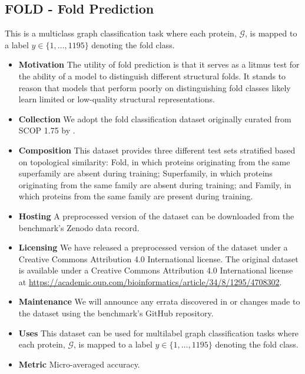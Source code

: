 \subsection{FOLD - Fold Prediction}
This is a multiclass graph classification task where each protein, $\mathcal{G}$, is mapped to a label $y \in \{1, \dots, 1195\}$ denoting the fold class.

\begin{itemize}
    \item \textbf{Motivation} The utility of fold prediction is that it serves as a litmus test for the ability of a model to distinguish different structural folds. It stands to reason that models that perform poorly on distinguishing fold classes likely learn limited or low-quality structural representations.
    \item \textbf{Collection} We adopt the fold classification dataset originally curated from SCOP 1.75 by \citep{hou2017}.
    \item \textbf{Composition} This dataset provides three different test sets stratified based on topological similarity: Fold, in which proteins originating from the same superfamily are absent during training; Superfamily, in which proteins originating from the same family are absent during training; and Family, in which proteins from the same family are present during training.
    \item \textbf{Hosting} A preprocessed version of the dataset can be downloaded from the benchmark's Zenodo data record.%
    \item \textbf{Licensing} We have released a preprocessed version of the dataset under a Creative Commons Attribution 4.0 International license. The original dataset is available under a Creative Commons Attribution 4.0 International license at \url{https://academic.oup.com/bioinformatics/article/34/8/1295/4708302}.
    \item \textbf{Maintenance} We will announce any errata discovered in or changes made to the dataset using the benchmark's GitHub repository.%
    \item \textbf{Uses} This dataset can be used for multilabel graph classification tasks where each protein, $\mathcal{G}$, is mapped to a label $y \in \{1, \dots, 1195\}$ denoting the fold class.
    \item \textbf{Metric} Micro-averaged accuracy.
\end{itemize}

